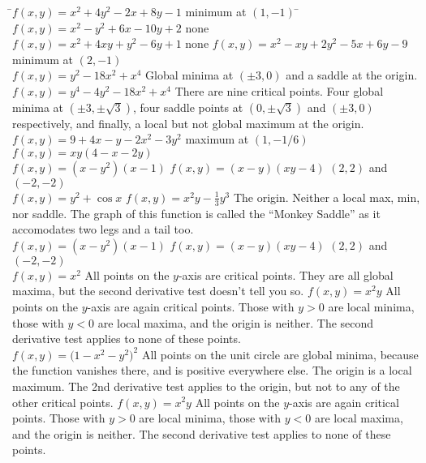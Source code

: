 \begin{tabbing}
\quad\=\subprob $f(x,y)=x^2+4y^2-2x+8y-1$\qquad
\answer minimum at $(1,-1)$
\endanswer
\=\subprob $f(x,y)=x^2-y^2+6x-10y+2$
\answer none
\endanswer
\\
\>\subprob $f(x,y)=x^2+4xy+y^2-6y+1$
\answer none
\endanswer
\>
\subprob  $f(x,y)=x^2-xy+2y^2-5x+6y-9$
\answer  minimum at $(2,-1)$
\endanswer
\\
\>\subprob $f(x,y) = y^2-18 x^2+x^4$
\answer 
Global minima at $(\pm 3,0)$ and a saddle at the origin.
\endanswer
\>\subprob $f(x,y) = y^4-4y^2-18 x^2+x^4$
\answer  
There are nine critical points. Four global minima at $(\pm 3,
\pm\sqrt{3})$, four saddle points at $(0,\pm\sqrt{3})$ and $(\pm3,0)$
respectively, and finally, a local but not global maximum at the
origin.
\endanswer
\\
\>\subprob $f(x,y)=9+4x-y-2x^2-3y^2$
\answer maximum at $(1,-1/6)$
\endanswer
\>
\subprob $f(x,y)=xy(4-x-2y)$
\answer 
\endanswer
\\
\>\subprob $f(x,y)=(x-y^2)(x-1)$
\answer  
\endanswer
\>
\subprob $f(x,y)=(x-y)(xy-4)$
\answer  $(2,2)$ and $(-2,-2)$
\endanswer
\\
\>\subprob $f(x,y)=y^2+\cos x$
\answer  
\endanswer
\>
\subprob $f(x,y)=x^2y-\frac13 y^3$
\answer The origin. Neither a local max, min, nor saddle.
The graph of this function is called the ``Monkey Saddle'' as
it accomodates two legs and a tail too.
\endanswer
\\
\>\subprob $f(x,y)=(x-y^2)(x-1)$
\answer  
\endanswer
\>
\subprob $f(x,y)=(x-y)(xy-4)$
\answer  $(2,2)$ and $(-2,-2)$
\endanswer
\\
\>\subprob $f(x,y) = x^2$
\answer  All points on the $y$-axis are critical points.  They are all
global maxima, but the second derivative test doesn't tell you so.
\endanswer
\>\subprob $f(x,y) = x^2y$
\answer
All points on the $y$-axis are again critical points.  Those with
$y>0$ are local minima, those with $y<0$ are local maxima, and the
origin is neither.  The second derivative test applies to none of
these points.
\endanswer
\\
\>\subprob $f(x,y) = \bigl(1-x^2-y^2\bigr)^2$
\answer  All points on the unit circle are global minima, because the
function vanishes there, and is positive everywhere else.  The origin
is a local maximum.  The 2nd derivative test applies to the origin,
but not to any of the other critical points.
\endanswer
\>\subprob $f(x,y) = x^2y$
\answer
All points on the $y$-axis are again critical points.  Those with
$y>0$ are local minima, those with $y<0$ are local maxima, and the
origin is neither.  The second derivative test applies to none of
these points.
\endanswer
\end{tabbing}



